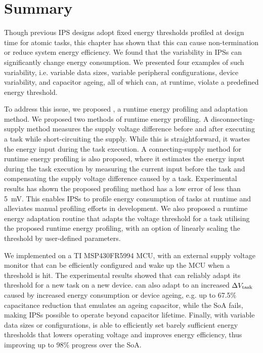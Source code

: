 \section{Summary} \label{sec:c5_summary}

Though previous IPS designs adopt fixed energy thresholds profiled at design time for atomic tasks, this chapter has shown that this can cause non-termination or reduce system energy efficiency. 
We found that the variability in IPSs can significantly change energy consumption.
We presented four examples of such variability, i.e. variable data sizes, variable peripheral configurations, device variability, and capacitor ageing, all of which can, at runtime, violate a predefined energy threshold. 

To address this issue, we proposed \nn{}, a runtime energy profiling and adaptation method. 
We proposed two methods of runtime energy profiling. 
A disconnecting-supply method measures the supply voltage difference before and after executing a task while short-circuiting the supply. 
While this is straightforward, it wastes the energy input during the task execution.
A connecting-supply method for runtime energy profiling is also proposed, where it estimates the energy input during the task execution by measuring the current input before the task and compensating the supply voltage difference caused by a task. 
Experimental results has shown the proposed profiling method has a low error of less than \SI{5}{\milli\volt}.
This enables IPSs to profile energy consumption of tasks at runtime and alleviates manual profiling efforts in development.
We also proposed a runtime energy adaptation routine that adapts the voltage threshold for a task utilising the proposed runtime energy profiling, with an option of linearly scaling the threshold by user-defined parameters. 

We implemented \nn{} on a TI MSP430FR5994 MCU, with an external supply voltage monitor that can be efficiently configured and wake up the MCU when a threshold is hit. 
The experimental results showed that \nn{} can reliably adapt its threshold for a new task on a new device. 
\nn{} can also adapt to an increased $\Delta V_{\text{task}}$ caused by increased energy consumption or device ageing, e.g. up to 67.5\% capacitance reduction that emulates an ageing capacitor, while the SoA fails, making IPSs possible to operate beyond capacitor lifetime. 
Finally, with variable data sizes or configurations, \nn{} is able to efficiently set barely sufficient energy thresholds that lowers operating voltage and improves energy efficiency, thus improving up to 98\% progress over the SoA. 

